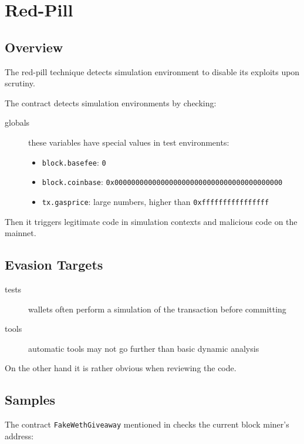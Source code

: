 \section{Red-Pill} \label{sec:red-pill}

\subsection{Overview}

The red-pill technique detects simulation environment to disable its exploits upon scrutiny. 

The contract detects simulation environments by checking:

\begin{description}
\item[globals]{these variables have special values in test environments:
\begin{itemize}
    \item{\lstinline[language=Solidity]{block.basefee}: \lstinline{0}}
    \item{\lstinline[language=Solidity]{block.coinbase}: \lstinline{0x0000000000000000000000000000000000000000}}
    \item{\lstinline[language=Solidity]{tx.gasprice}: large numbers, higher than \lstinline{0xffffffffffffffff}}
\end{itemize}}
\end{description}

Then it triggers legitimate code in simulation contexts and malicious code on the mainnet.

\subsection{Evasion Targets}

\begin{description}
\item[tests]{wallets often perform a simulation of the transaction before committing}
\item[tools]{automatic tools may not go further than basic dynamic analysis}
\end{description}

On the other hand it is rather obvious when reviewing the code.

\subsection{Samples}

The contract \lstinline{FakeWethGiveaway} mentioned in \cite{article-red-pill} checks the current block miner’s address:

